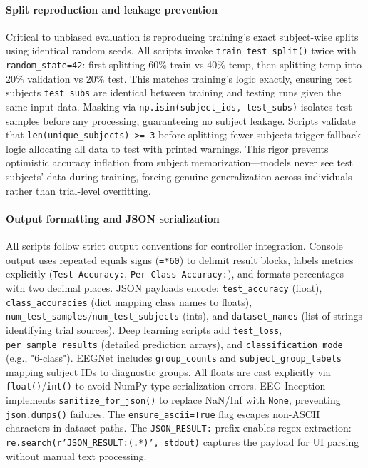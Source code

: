 \documentclass[12pt]{report}
\begin{document}
\paragraph{Split reproduction and leakage prevention}\mbox{}

Critical to unbiased evaluation is reproducing training's exact subject-wise splits using identical random seeds. All scripts invoke \texttt{train\_test\_split()} twice with \texttt{random\_state=42}: first splitting 60\% train vs 40\% temp, then splitting temp into 20\% validation vs 20\% test. This matches training's logic exactly, ensuring test subjects \texttt{test\_subs} are identical between training and testing runs given the same input data. Masking via \texttt{np.isin(subject\_ids, test\_subs)} isolates test samples before any processing, guaranteeing no subject leakage. Scripts validate that \texttt{len(unique\_subjects) >= 3} before splitting; fewer subjects trigger fallback logic allocating all data to test with printed warnings. This rigor prevents optimistic accuracy inflation from subject memorization—models never see test subjects' data during training, forcing genuine generalization across individuals rather than trial-level overfitting.

\paragraph{Output formatting and JSON serialization}\mbox{}

All scripts follow strict output conventions for controller integration. Console output uses repeated equals signs (\texttt{=*60}) to delimit result blocks, labels metrics explicitly (\texttt{Test Accuracy:}, \texttt{Per-Class Accuracy:}), and formats percentages with two decimal places. JSON payloads encode: \texttt{test\_accuracy} (float), \texttt{class\_accuracies} (dict mapping class names to floats), \texttt{num\_test\_samples}/\texttt{num\_test\_subjects} (ints), and \texttt{dataset\_names} (list of strings identifying trial sources). Deep learning scripts add \texttt{test\_loss}, \texttt{per\_sample\_results} (detailed prediction arrays), and \texttt{classification\_mode} (e.g., "6-class"). EEGNet includes \texttt{group\_counts} and \texttt{subject\_group\_labels} mapping subject IDs to diagnostic groups. All floats are cast explicitly via \texttt{float()}/\texttt{int()} to avoid NumPy type serialization errors. EEG-Inception implements \texttt{sanitize\_for\_json()} to replace NaN/Inf with \texttt{None}, preventing \texttt{json.dumps()} failures. The \texttt{ensure\_ascii=True} flag escapes non-ASCII characters in dataset paths. The \texttt{JSON\_RESULT:} prefix enables regex extraction: \texttt{re.search(r'JSON\_RESULT:(.*)', stdout)} captures the payload for UI parsing without manual text processing.
\end{document}
